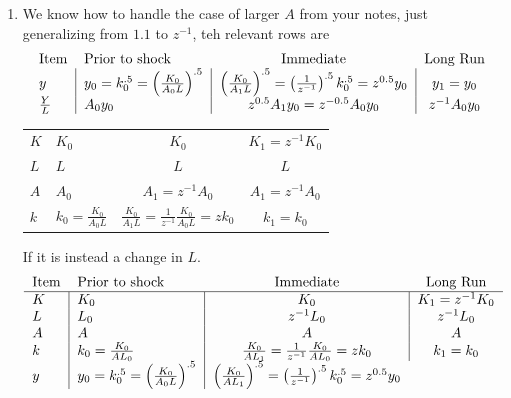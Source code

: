 \documentclass{article}
\begin{document}
\begin{enumerate}
\begin{enumerate}
\item We know how to handle the case of larger $A$ from your notes, just
generalizing from $1.1$ to $z^{-1}$, teh relevant rows are     
\begin{equation*}
\begin{tabular}{llcc}
Item & Prior to shock & Immediate & Long Run \\ 
$y$ & \multicolumn{1}{|l}{$y_{0}=k_{0}^{.5}=\left( \frac{K_{0}}{A_{0}L}%
\right) ^{.5}$} & \multicolumn{1}{|c}{$\left( \frac{K_{0}}{A_{1}L}\right)
^{.5}=\left( \frac{1}{z^{-1}}\right) ^{.5}k_{0}^{.5}=z^{0.5}y_{0}$ } & 
\multicolumn{1}{|c}{$y_{1}=y_{0}$} \\ 
$\frac{Y}{L}$ & \multicolumn{1}{|l}{$A_{0}y_{0}$} & \multicolumn{1}{|c}{$%
z^{0.5}A_{1}y_{0}=z^{-0.5}A_{0}y_{0}$} & \multicolumn{1}{|c}{$%
z^{-1}A_{0}y_{0}$}%
\end{tabular}%
\end{equation*}%
\begin{tabular}{l|l|c|c}
\hline
$K$ & $K_{0}$ & $K_{0}$ & $K_{1}=z^{-1}K_{0}$ \\ 
$L$ & $L$ & $L$ & $L$ \\ 
$A$ & $A_{0}$ & $A_{1}=z^{-1}A_{0}$ & $A_{1}=z^{-1}A_{0}$ \\ 
$k$ & $k_{0}=\frac{K_{0}}{A_{0}L}$ & $\frac{K_{0}}{A_{1}L}=\frac{1}{z^{-1}}%
\frac{K_{0}}{A_{0}L}=zk_{0}$ & $k_{1}=k_{0}$%
\end{tabular}%
If it is instead a change in $L.$%
\begin{equation*}
\begin{tabular}{llcc}
Item & Prior to shock & Immediate & Long Run \\ \hline
$K$ & \multicolumn{1}{|l}{$K_{0}$} & \multicolumn{1}{|c}{$K_{0}$} & 
\multicolumn{1}{|c}{$K_{1}=z^{-1}K_{0}$} \\ 
$L$ & \multicolumn{1}{|l}{$L_{0}$} & \multicolumn{1}{|c}{$z^{-1}L_{0}$} & 
\multicolumn{1}{|c}{$z^{-1}L_{0}$} \\ 
$A$ & \multicolumn{1}{|l}{$A$} & \multicolumn{1}{|c}{$A$} & 
\multicolumn{1}{|c}{$A$} \\ 
$k$ & \multicolumn{1}{|l}{$k_{0}=\frac{K_{0}}{AL_{0}}$} & 
\multicolumn{1}{|c}{$\frac{K_{0}}{AL_{1}}=\frac{1}{z^{-1}}\frac{K_{0}}{AL_{0}%
}=zk_{0}$} & \multicolumn{1}{|c}{$k_{1}=k_{0}$} \\ 
$y$ & \multicolumn{1}{|l}{$y_{0}=k_{0}^{.5}=\left( \frac{K_{0}}{A_{0}L}%
\right) ^{.5}$} & \multicolumn{1}{|c}{$\left( \frac{K_{0}}{AL_{1}}\right)
^{.5}=\left( \frac{1}{z^{-1}}\right) ^{.5}k_{0}^{.5}=z^{0.5}y_{0}$ } & 

\end{tabular}
\end{equation*}
\end{enumerate}
\end{enumerate}
\end{document}
